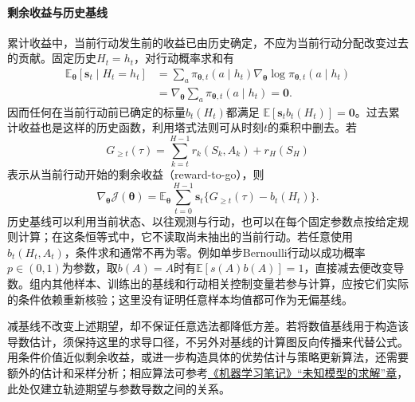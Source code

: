\paragraph{剩余收益与历史基线}
累计收益中，当前行动发生前的收益已由历史确定，不应为当前行动分配改变过去的贡献。固定历史\(H_t=h_t\)，对行动概率求和有
\begin{equation}
 \begin{aligned}
 \mathbb E_{\bm\theta}[\bm s_t\mid H_t=h_t]
 &=\sum_a\pi_{\bm\theta,t}(a\mid h_t)
       \nabla_{\bm\theta}\log\pi_{\bm\theta,t}(a\mid h_t)\\
 &=\nabla_{\bm\theta}\sum_a\pi_{\bm\theta,t}(a\mid h_t)=\bm0.
 \end{aligned}
 \label{eq:decision-history-score-zero}
\end{equation}
因而任何在当前行动前已确定的标量\(b_t(H_t)\)都满足
\(\mathbb E[\bm s_tb_t(H_t)]=\bm0\)。过去累计收益也是这样的历史函数，利用塔式法则可从时刻\(t\)的乘积中删去。若
\[
 G_{\geq t}(\tau)=\sum_{k=t}^{H-1}r_k(S_k,A_k)+r_H(S_H)
\]
表示从当前行动开始的剩余收益（reward-to-go），则
\begin{equation}
 \nabla_{\bm\theta}\mathcal J(\bm\theta)
 =\mathbb E_{\bm\theta}\sum_{t=0}^{H-1}
   \bm s_t\{G_{\geq t}(\tau)-b_t(H_t)\}.
 \label{eq:decision-return-to-go-baseline}
\end{equation}
历史基线可以利用当前状态、以往观测与行动，也可以在每个固定参数点按给定规则计算；在这条恒等式中，它不读取尚未抽出的当前行动。若任意使用\(b_t(H_t,A_t)\)，条件求和通常不再为零。例如单步Bernoulli行动以成功概率\(p\in(0,1)\)为参数，取\(b(A)=A\)时有\(\mathbb E[s(A)b(A)]=1\)，直接减去便改变导数。组内其他样本、训练出的基线和行动相关控制变量若参与计算，应按它们实际的条件依赖重新核验；这里没有证明任意样本均值都可作为无偏基线。

减基线不改变上述期望，却不保证任意选法都降低方差。若将数值基线用于构造该导数估计，须保持这里的求导口径，不另外对基线的计算图反向传播来代替公式。用条件价值近似剩余收益，或进一步构造具体的优势估计与策略更新算法，还需要额外的估计和采样分析；相应算法可参考\href{https://github.com/shixiaogang/notes-on-machine-learning/blob/ff88d50e0edf94a815bc6e16e76ded414f406dc2/tex/10-reinforcement-learning/01-problems-and-solving/03-learning.tex}{《机器学习笔记》“未知模型的求解”章}，此处仅建立轨迹期望与参数导数之间的关系。


